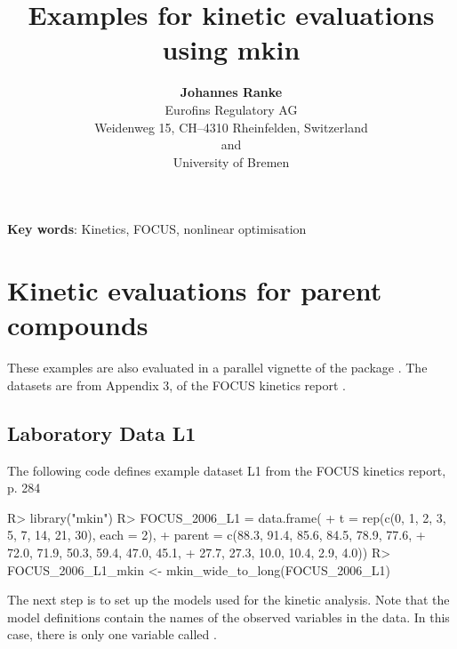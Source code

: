 \documentclass[12pt,a4paper]{article}
\begin{document}
\title{Examples for kinetic evaluations using mkin}
\author{\textbf{Johannes Ranke} \\[0.5cm]
Eurofins Regulatory AG\\
Weidenweg 15, CH--4310 Rheinfelden, Switzerland\\[0.5cm]
and\\[0.5cm]
University of Bremen\\
}
\maketitle



\thispagestyle{empty} \setcounter{page}{0}

\clearpage

\tableofcontents

\textbf{Key words}: Kinetics, FOCUS, nonlinear optimisation

\section{Kinetic evaluations for parent compounds}
\label{intro}

These examples are also evaluated in a parallel vignette of the
 package \citep{pkg:kinfit}. The datasets are from Appendix 3,
of the FOCUS kinetics report \citep{FOCUS2006, FOCUSkinetics2011}.

\subsection{Laboratory Data L1}

The following code defines example dataset L1 from the FOCUS kinetics
report, p. 284

\begin{Schunk}
\begin{Sinput}
R> library("mkin")
R> FOCUS_2006_L1 = data.frame(
+   t = rep(c(0, 1, 2, 3, 5, 7, 14, 21, 30), each = 2),
+   parent = c(88.3, 91.4, 85.6, 84.5, 78.9, 77.6, 
+              72.0, 71.9, 50.3, 59.4, 47.0, 45.1,
+              27.7, 27.3, 10.0, 10.4, 2.9, 4.0))
R> FOCUS_2006_L1_mkin <- mkin_wide_to_long(FOCUS_2006_L1)
\end{Sinput}
\end{Schunk}

The next step is to set up the models used for the kinetic analysis. Note that
the model definitions contain the names of the observed variables in the data.
In this case, there is only one variable called .
\end{document}
